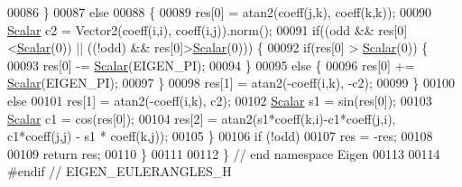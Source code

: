 \begin{DoxyCode}
00086   \} 
00087   \textcolor{keywordflow}{else}
00088   \{
00089     res[0] = atan2(coeff(j,k), coeff(k,k));
00090     \hyperlink{group___core___module_a5feed465b3a8e60c47e73ecce83e39a2}{Scalar} c2 = Vector2(coeff(i,i), coeff(i,j)).norm();
00091     \textcolor{keywordflow}{if}((odd && res[0]<\hyperlink{group___core___module_a5feed465b3a8e60c47e73ecce83e39a2}{Scalar}(0)) || ((!odd) && res[0]>\hyperlink{group___core___module_a5feed465b3a8e60c47e73ecce83e39a2}{Scalar}(0))) \{
00092       \textcolor{keywordflow}{if}(res[0] > \hyperlink{group___core___module_a5feed465b3a8e60c47e73ecce83e39a2}{Scalar}(0)) \{
00093         res[0] -= \hyperlink{group___core___module_a5feed465b3a8e60c47e73ecce83e39a2}{Scalar}(EIGEN\_PI);
00094       \}
00095       \textcolor{keywordflow}{else} \{
00096         res[0] += \hyperlink{group___core___module_a5feed465b3a8e60c47e73ecce83e39a2}{Scalar}(EIGEN\_PI);
00097       \}
00098       res[1] = atan2(-coeff(i,k), -c2);
00099     \}
00100     \textcolor{keywordflow}{else}
00101       res[1] = atan2(-coeff(i,k), c2);
00102     \hyperlink{group___core___module_a5feed465b3a8e60c47e73ecce83e39a2}{Scalar} s1 = sin(res[0]);
00103     \hyperlink{group___core___module_a5feed465b3a8e60c47e73ecce83e39a2}{Scalar} c1 = cos(res[0]);
00104     res[2] = atan2(s1*coeff(k,i)-c1*coeff(j,i), c1*coeff(j,j) - s1 * coeff(k,j));
00105   \}
00106   \textcolor{keywordflow}{if} (!odd)
00107     res = -res;
00108   
00109   \textcolor{keywordflow}{return} res;
00110 \}
00111 
00112 \} \textcolor{comment}{// end namespace Eigen}
00113 
00114 \textcolor{preprocessor}{#endif // EIGEN\_EULERANGLES\_H}
\end{DoxyCode}
